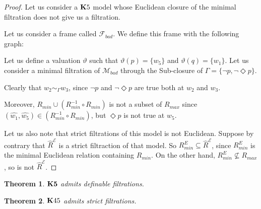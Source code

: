 \documentclass[a4paper]{article}
\theoremstyle{defin}
\theoremstyle{theorem}
\newtheorem{theorem}{Theorem}
\theoremstyle{prop}
\theoremstyle{lemma}
\theoremstyle{fact}
\theoremstyle{exercise}
\theoremstyle{ex}
\theoremstyle{col}
\theoremstyle{claim}
\begin{document}
\begin{proof}
  Let us consider a ${\bf K}5$ model whose Euclidean closure of the minimal filtration does not give us a filtration.

  Let us consider a frame called $\mathcal{F}_{bad}$. We define this frame with the following graph:

\vspace{\baselineskip}


Let us define a valuation $\vartheta$ such that $\vartheta(p) = \{ w_5\}$ and $\vartheta(q) = \{ w_1\}$. Let us consider a minimal filtration of $\mathcal{M}_{bad}$ through the Sub-closure of $\Gamma = \{ \neg p, \neg \Diamond p\}$.

Clearly that $w_2 \sim_{\Gamma} w_3$, since $\neg p$ and $\neg \Diamond p$ are true both at $w_2$ and $w_3$.

Moreover, $R_{min} \cup (R_{min}^{-1} \circ R_{min})$ is not a subset of $R_{max}$ since $(\hat{w_1}, \hat{w_5}) \in (R_{min}^{-1} \circ R_{min})$, but $\Diamond p$ is not true at $w_5$.

Let us also note that strict filtrations of this model is not Euclidean.
Suppose by contrary that $\widehat{R}^{\mathcal{E}}$ is a strict filtraction of that model. So $R_{min}^E \subseteq \widehat{R}^{\mathcal{E}}$, since $R_{min}^E$ is the minimal Euclidean relation containing $R_{min}$. On the other hand, $R_{min}^E \not\subseteq R_{max}$, so is not $\widehat{R}^{\mathcal{E}}$.
\end{proof}

\begin{theorem}
  ${\bf K5}$ admits definable filtrations.
\end{theorem}

\begin{theorem}
  ${\bf K}45$ admits strict filtrations.
\end{theorem}
\end{document}
